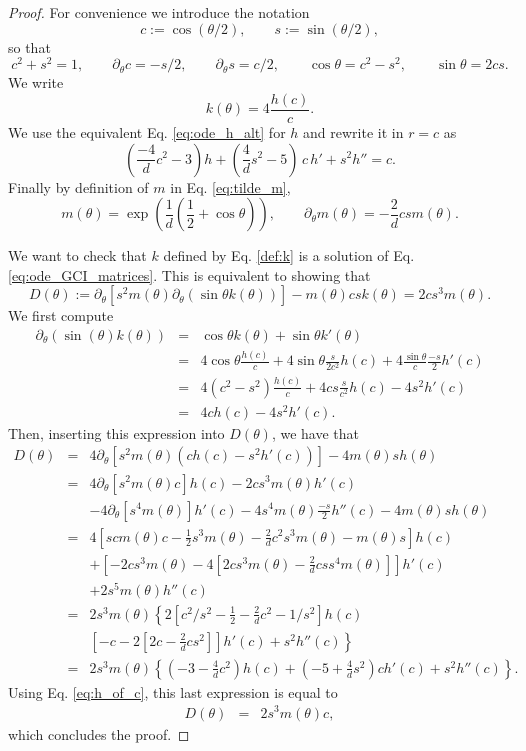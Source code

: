 \documentclass[12pt]{article}
\def\pa{\partial}
\newcommand{\lp}{\left(}
\newcommand{\rp}{\right)}
\newcommand{\be}{\begin{equation}}
\newcommand{\ee}{\end{equation}}
\begin{document}
\begin{proof}
For convenience we introduce the notation
$$c:=\cos(\theta/2), \qquad s:=\sin(\theta/2),$$
so that
$$c^2+s^2=1, \qquad \pa_\theta c = -s/2, \qquad \pa_\theta s = c/2, \qquad \cos \theta = c^2-s^2,\qquad \sin\theta = 2cs.$$
We write
$$ k(\theta)=4\frac{h\lp c\rp}{c}.$$
We use the equivalent Eq. \eqref{eq:ode_h_alt} for $h$ and rewrite it in $r=c$ as
\be\label{eq:h_of_c}
\lp \frac{-4}{d}c^2-3\rp h+ \lp\frac{4}{d}s^2-5 \rp\,c\, h' + s^2 h''=c.
\ee
Finally by definition of $m$ in Eq. \eqref{eq:tilde_m},
$$m(\theta) = \exp\lp \frac{1}{d} (\frac{1}{2}+ \cos \theta) \rp, \qquad \pa_\theta m(\theta) = - \frac{2}{d} cs m(\theta).$$

We want to check that $k$ defined by Eq. \eqref{def:k} is a solution of Eq. \eqref{eq:ode_GCI_matrices}. This is equivalent to showing that
$$D(\theta):=\pa_\theta[s^2 m(\theta) \pa_\theta (\sin\theta k(\theta))] - m(\theta) c s k(\theta) = 2 cs^3 m(\theta).$$
We first compute
\begin{eqnarray*}
\pa_\theta \lp \sin(\theta) k(\theta) \rp &=& \cos\theta k(\theta) + \sin\theta k'(\theta) \\
&=&4 \cos\theta \frac{h\lp c\rp}{c} +4 \sin\theta\frac{s}{2 c^2} h(c) + 4\frac{\sin\theta}{c}\frac{-s}{2} h'(c)\\
&=&4 (c^2-s^2) \frac{h\lp c\rp}{c} +4 cs \frac{s}{c^2} h(c) - 4 s^2 h'(c)\\
&=&4 c h\lp c\rp  - 4 s^2 h'(c).
\end{eqnarray*}
Then, inserting this expression into $D(\theta)$, we have that
\begin{eqnarray*}
D(\theta)&=& 4 \pa_\theta[s^2 m(\theta) \lp c h\lp c\rp -s^2 h'(c)\rp] - 4 m(\theta) s h(\theta) \\
&=&4 \pa_\theta[s^2 m(\theta) c] h\lp c\rp - 2 c s^3 m(\theta) h'\lp c\rp\\
&&- 4 \pa_\theta[s^4 m(\theta) ]h'(c) - 4 s^4 m(\theta) \frac{-s}{2} h''(c) - 4 m(\theta) s h(\theta)\\
&=&4 \left[sc m(\theta) c-\frac{1}{2}s^3 m(\theta)-\frac{2}{d}c^2s^3 m(\theta) - m(\theta) s\right] h\lp c\rp\\
&&+\left[- 2 c s^3 m(\theta) - 4 [2 c s^3 m(\theta) - \frac{2}{d} cs s^4 m(\theta) ]  \right] h'\lp c\rp\\
&& + 2 s^5 m(\theta) h''(c)\\
&=&2 s^3 m(\theta)  \left\{ 2 \left[ c^2/s^2-\frac{1}{2} -\frac{2}{d}c^2 - 1/s^2 \right] h\lp c\rp \right.\\
&&\left.\left[  - c - 2 [2 c - \frac{2}{d} cs^2 ]   \right] h'\lp c\rp + s^2 h''(c) \right\}\\
&=&2 s^3 m(\theta)  \left\{ (-3 -\frac{4}{d} c^2) h\lp c\rp + (- 5 + \frac{4}{d} s^2) ch'\lp c\rp + s^2 h''(c) \right\}.
\end{eqnarray*}
Using Eq. \eqref{eq:h_of_c}, this last expression is equal to
\begin{eqnarray}
D(\theta) &=&2 s^3 m(\theta) c,
\end{eqnarray}
which concludes the proof.
\end{proof}










\end{document}
